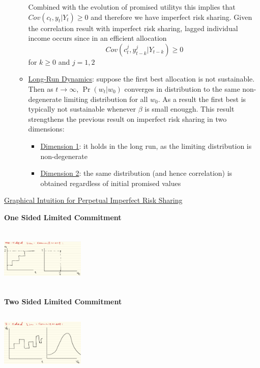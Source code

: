 \documentclass{article}
\begin{document}
\begin{itemize}
\begin{itemize}
\begin{itemize}
        \end{itemize}
        Combined with the evolution of promised utilitys this implies that $Cov(c_{t}, y_{t} | Y_{t}) \geq 0$ and therefore we have imperfect risk sharing. Given the correlation result with imperfect risk sharing, lagged individual income occurs since in an efficient allocation $$Cov(c_{t}^{j}, y_{t-k}^{j} | Y_{t-k}) \geq 0$$ for $k \geq 0$ and $j = 1,2$
        \item \underline{Long-Run Dynamics}: suppose the first best allocation is not sustainable. Then as $t \rightarrow \infty$, $\Pr(w_{t} | w_{0})$ converges in distribution to the same non-degenerate limiting distribution for all $w_{0}$.
        As a result the first best is typically not sustainable whenever $\beta$ is small enouggh. This result strengthens the previous result on imperfect risk sharing in two dimensions:
        \begin{itemize}
            \item  \underline{Dimension 1}: it holds in the long run, as the limiting distribution is non-degenerate
            \item  \underline{Dimension 2}: the same distribution (and hence correlation) is obtained regardless of initial promised values
        \end{itemize}
    \end{itemize}
\end{itemize}
\underline{Graphical Intuition for Perpetual Imperfect Risk Sharing}
\begin{center}
\textbf{One Sided Limited Commitment} \par
\includegraphics[width=4cm, height=3cm]{pic17}
\end{center}
\begin{center}
\textbf{Two Sided Limited Commitment} \par
\includegraphics[width=4cm, height=3cm]{pic18}
\end{center}
\end{document}
